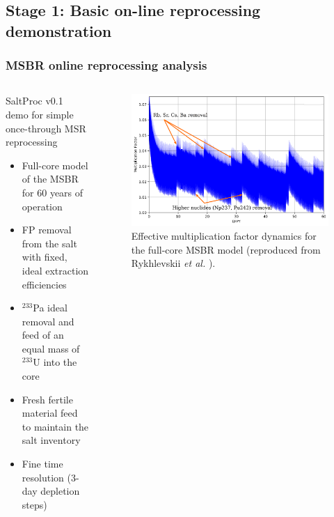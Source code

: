 \subsection{Stage 1: Basic on-line reprocessing demonstration}

\begin{frame}
\frametitle{MSBR online reprocessing analysis}

\begin{columns}
	\column[t]{4.3cm}
	\begin{block}{SaltProc v0.1 demo for simple once-through \gls{MSR} 
	reprocessing}
		\fontsize{7}{9}\selectfont
		\begin{itemize}
			\item Full-core model of the \gls{MSBR} for 60 years of operation
			\item FP removal from the salt with fixed, ideal extraction 
			efficiencies 
			\item $^{233}$Pa ideal removal and feed of an equal mass of 
			$^{233}$U into the core
			\item Fresh fertile material feed to maintain the salt inventory
			\item Fine time resolution (3-day depletion steps)
		\end{itemize}
	\end{block}    	
	
	\column[t]{8cm}
		\begin{figure}[ht!] 
		\centering
			\includegraphics[width=\textwidth]{../figures/keff_msbr.png}
			\caption{Effective multiplication factor dynamics for the 
			full-core \gls{MSBR} model (reproduced from  
			Rykhlevskii \emph{et al.} \cite{rykhlevskii_modeling_2019}).}
		\end{figure}
	
\end{columns}
\end{frame}


